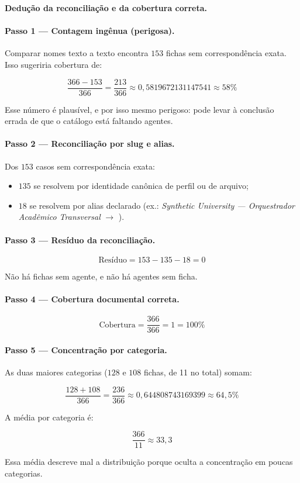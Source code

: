 \begin{metodo}
\textbf{Dedução da reconciliação e da cobertura correta.}

\paragraph{Passo 1 — Contagem ingênua (perigosa).}
Comparar nomes texto a texto encontra $153$ fichas sem correspondência exata. Isso sugeriria cobertura de:

\[
\frac{366 - 153}{366} = \frac{213}{366} \approx 0{,}5819672131147541 \approx 58\%
\]

Esse número é plausível, e por isso mesmo perigoso: pode levar à conclusão errada de que o catálogo está faltando agentes.

\paragraph{Passo 2 — Reconciliação por slug e alias.}
Dos $153$ casos sem correspondência exata:
\begin{itemize}[leftmargin=1.3em,itemsep=1pt]
  \item $135$ se resolvem por identidade canônica de perfil ou de arquivo;
  \item $18$ se resolvem por alias declarado (ex.: \emph{Synthetic University — Orquestrador Acadêmico Transversal} $\to$ ).
\end{itemize}

\paragraph{Passo 3 — Resíduo da reconciliação.}

\[
\text{Resíduo} = 153 - 135 - 18 = 0
\]

Não há fichas sem agente, e não há agentes sem ficha.

\paragraph{Passo 4 — Cobertura documental correta.}

\[
\boxed{\text{Cobertura} = \frac{366}{366} = 1 = 100\%}
\]

\paragraph{Passo 5 — Concentração por categoria.}
As duas maiores categorias ($128$ e $108$ fichas, de 11 no total) somam:

\[
\frac{128 + 108}{366} = \frac{236}{366} \approx 0{,}644808743169399 \approx 64,5\%
\]

A média por categoria é:

\[
\frac{366}{11} \approx 33,3
\]

Essa média descreve mal a distribuição porque oculta a concentração em poucas categorias.

\end{metodo}

